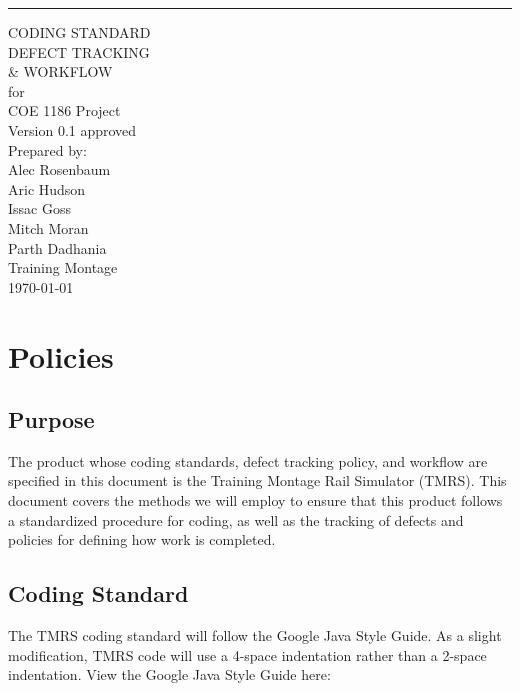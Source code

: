 \documentclass{scrreprt}
\date{}
\def\myversion{0.1 }
\begin{document}
\begin{flushright}
    \rule{16cm}{5pt}\vskip1cm
    \begin{bfseries}
        \Huge{CODING STANDARD\\ 
        DEFECT TRACKING\\ 
        \& WORKFLOW}\\
        \vspace{.9cm}
        for\\
        \vspace{.9cm}
        COE 1186 Project\\
        \vspace{.9cm}
        \LARGE{Version \myversion approved}\\
        \vspace{.9cm}
        Prepared by:\\
        Alec Rosenbaum\\
        Aric Hudson\\
        Issac Goss\\
        Mitch Moran\\
        Parth Dadhania\\
        \vspace{1.9cm}
        Training Montage\\
        \vspace{.9cm}
        \today\\
    \end{bfseries}
\end{flushright}

\tableofcontents

\chapter{Policies}

\section{Purpose}
The product whose coding standards, defect tracking policy, and workflow are specified in this document is the Training Montage Rail Simulator (TMRS). This document covers the methods we will employ to ensure that this product follows a standardized procedure for coding, as well as the tracking of defects and policies for defining how work is completed.

\section{Coding Standard}
The TMRS coding standard will follow the Google Java Style Guide. As a slight modification, TMRS code will use a 4-space indentation rather than a 2-space indentation. View the Google Java Style Guide here:
\end{document}
